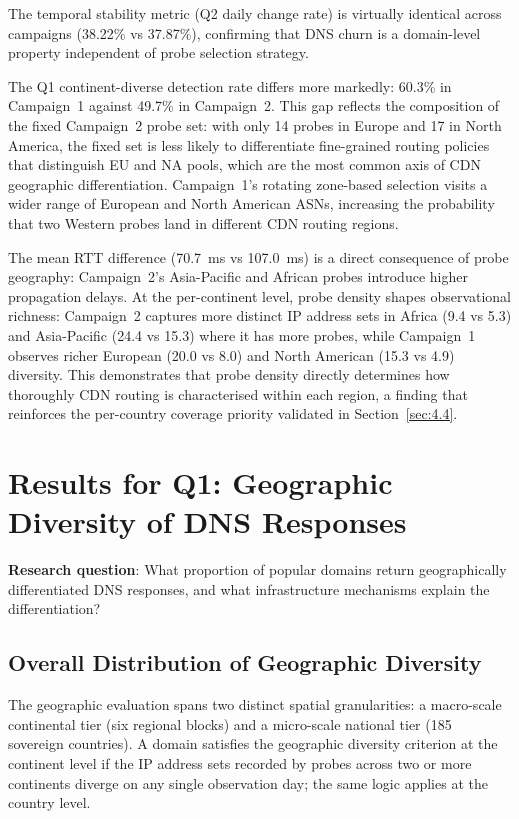 The temporal stability metric (Q2 daily change rate) is virtually identical across campaigns (38.22\% vs 37.87\%), confirming that \ac{DNS} churn is a domain-level property independent of probe selection strategy.

The Q1 continent-diverse detection rate differs more markedly: 60.3\% in Campaign~1 against 49.7\% in Campaign~2. This gap reflects the composition of the fixed Campaign~2 probe set: with only 14 probes in Europe and 17 in North America, the fixed set is less likely to differentiate fine-grained routing policies that distinguish EU and NA pools, which are the most common axis of CDN geographic differentiation. Campaign~1's rotating zone-based selection visits a wider range of European and North American \acp{ASN}, increasing the probability that two Western probes land in different CDN routing regions.

The mean \ac{RTT} difference (70.7~ms vs 107.0~ms) is a direct consequence of probe geography: Campaign~2's Asia-Pacific and African probes introduce higher propagation delays. At the per-continent level, probe density shapes observational richness: Campaign~2 captures more distinct \ac{IP} address sets in Africa (9.4 vs 5.3) and Asia-Pacific (24.4 vs 15.3) where it has more probes, while Campaign~1 observes richer European (20.0 vs 8.0) and North American (15.3 vs 4.9) diversity. This demonstrates that probe density directly determines how thoroughly \ac{CDN} routing is characterised within each region, a finding that reinforces the per-country coverage priority validated in Section~\ref{sec:4.4}.

\bigskip
\section{Results for Q1: Geographic Diversity of DNS Responses}
\label{sec:4.2}

\textbf{Research question}: What proportion of popular domains return geographically differentiated \ac{DNS} responses, and what infrastructure mechanisms explain the differentiation?

\subsection{Overall Distribution of Geographic Diversity}
\label{subsec:4.2.1}

The geographic evaluation spans two distinct spatial granularities: a macro-scale continental tier (six regional blocks) and a micro-scale national tier (185 sovereign countries). A domain satisfies the geographic diversity criterion at the continent level if the \ac{IP} address sets recorded by probes across two or more continents diverge on any single observation day; the same logic applies at the country level.

